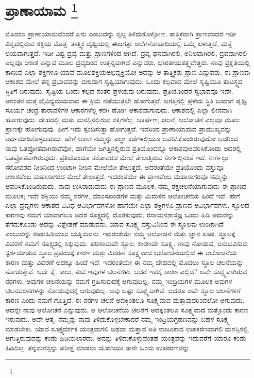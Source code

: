 
\vspace{-0.8cm}

\chapter[ಪ್ರಾಣಾಯಾಮ ]{ಪ್ರಾಣಾಯಾಮ \protect\footnote{}}

ಮೊದಲು ಪ್ರಾಣಾಯಾಮವೆಂದರೆ ಏನು ಎಂಬುದನ್ನು ಸ್ವಲ್ಪ ತಿಳಿದುಕೊಳ್ಳೋಣ. ತಾತ್ತ್ವಿಕವಾಗಿ ಪ್ರಾಣವೆಂದರೆ ಇಡೀ ವಿಶ್ವದಲ್ಲಿರುವ ಶಕ್ತಿಯ ಮೊತ್ತ. ತಾತ್ತ್ವಿಕ ದೃಷ್ಟಿಯಲ್ಲಿ ಈ\break ಜಗತ್ತು ಅಲೆಗಳೋಪಾದಿಯಲ್ಲಿ ಒಮ್ಮೆ ಏಳುತ್ತದೆ, ಮತ್ತೆ ಲಯವಾಗುತ್ತದೆ. ಇಡೀ ವಿಶ್ವ ದ್ರವ್ಯ ಮತ್ತು ಪ್ರಾಣಗಳಿಂದ ಆಗಿದೆ. ದ್ರವ್ಯ ಘನವಾಗಿರಲಿ, ಅನಿಲವಾಗಿರಲಿ, ದ್ರವವಾಗಿರಲಿ ಎಲ್ಲವೂ ಆಕಾಶ ಎನ್ನುವ ಮೂಲ ದ್ರವ್ಯದಿಂದ ಉತ್ಪನ್ನವಾಗಿದೆ ಎನ್ನುವರು, ಭಾರತೀಯ\break ತತ್ತ್ವವೇತ್ತರು. ನಾವು ಪ್ರಕೃತಿಯಲ್ಲಿ ಕಾಣುವ ಎಲ್ಲಾ ಶಕ್ತಿಗಳೂ ಯಾವ ಮೂಲಶಕ್ತಿಯ\break ಅಭಿವ್ಯಕ್ತಿಯೋ ಅದನ್ನು ಆ ತಾತ್ತ್ವಿಕರು ಪ್ರಾಣ ಎನ್ನುವರು. ಈ ಪ್ರಾಣವು ಆಕಾಶದ ಮೇಲೆ ತನ್ನ ಪ್ರಭಾವವನ್ನು ಬೀರಿದಾಗ ಸೃಷ್ಟಿಯಾಗುವುದು. ಒಂದು ಕಲ್ಪವಾದ ಮೇಲೆ ಸೃಷ್ಟಿಯೂ ತಾಟಸ್ಥ್ಯದ ಸ್ಥಿತಿಗೆ ಬರುವುದು. ಸೃಷ್ಟಿಯ ಒಂದು ಕಲ್ಪದ ನಂತರ ಪ್ರಳಯವು ಬರುವುದು. ಪ್ರತಿಯೊಂದರ ಸ್ವಭಾವವೂ ಇದೇ. ಅನಂತರ ಮತ್ತೆ ವೈವಿಧ್ಯಮಯವಾದ ಈ ಕ್ರಿಯೆ ನಡೆಯುತ್ತಲೇ ಹೋಗುತ್ತದೆ. ಜಗತ್ತಿನಲ್ಲಿ ಪ್ರಳಯ ಸ್ಥಿತಿ ಬಂದಾಗ ಪೃಥ್ವಿ ಸೂರ್ಯ ಚಂದ್ರ ತಾರಾವಳಿಗಳ ಆಕಾರಗಳೆಲ್ಲ ಕರಗಿ ಹೋಗಿ ಆಕಾಶವಾಗುವುದು. ಆಕಾಶದಲ್ಲಿ ಎಲ್ಲಾ ಲೀನವಾಗಿ ಹೋಗುವುದು. ದೇಹದಲ್ಲಿ ಮತ್ತು ಮನಸ್ಸಿನಲ್ಲಿರುವ ಶಕ್ತಿಗಳೆಲ್ಲ, ಆಕರ್ಷಣ, ಚಲನೆ, ಆಲೋಚನೆ ಎಲ್ಲವೂ ಮೂಲ ಪ್ರಾಣಕ್ಕೇ ಹೋಗುವುವು. ಹೀಗೆ ಇದು ಸ್ಪಂದಿಸುತ್ತಾ ಹೋಗುತ್ತದೆ. ಇದರಿಂದ ಪ್ರಾಣಾಯಾಮದ ಪ್ರಾಮುಖ್ಯವನ್ನು ಅರ್ಥಮಾಡಿಕೊಳ್ಳಬಹುದು. ಹೇಗೆ ಆಕಾಶ ನಮ್ಮನ್ನು ಎಲ್ಲಾ ಕಡೆಗಳಲ್ಲಿಯೂ ಆವರಿಸಿಕೊಂಡಿರುವುದೋ ಅದರಿಂದ ನಾವು ಓತಪ್ರೋತವಾಗಿರುವೆವೋ, ಹಾಗೆಯೇ ಜಗತ್ತಿನಲ್ಲಿರುವ ಪ್ರತಿಯೊಂದನ್ನೂ ಆಕಾಶವು\break ಆವರಿಸಿಕೊಂಡು ಅದರಲ್ಲಿ ಓತಪ್ರೋತವಾಗಿರುವುದು. ಪ್ರತಿಯೊಂದೂ ಸರೋವರದ ಮೇಲೆ ತೇಲುತ್ತಿರುವ ನೀರ್ಗಲ್ಲಿನಂತೆ ಇದೆ. ನೀರ್ಗಲ್ಲು ಸರೋವರದ ನೀರಿನಿಂದ ಉಂಟಾಗಿ ನೀರಿನ ಮೇಲೆಯೇ ತೇಲುತ್ತದೆ. ಅದರಂತೆಯೇ ಪ್ರತಿಯೊಂದು ವಸ್ತುವೂ ಆಕಾಶವೆಂಬ ಮಹಾಸಾಗರದ ಮೇಲೆ ತೇಲುತ್ತದೆ. ಇದರಂತೆಯೇ ಈ ಪ್ರಾಣವೆಂಬ ಮಹಾಸಾಗರವೂ ನಮ್ಮನ್ನು ಆವರಿಸಿಕೊಂಡಿರುವುದು. ನಾವು ಉಸಿರಾಡುವುದು ಈ ಪ್ರಾಣದ ಮೂಲಕ, ನಮ್ಮ ರಕ್ತಚಲನೆಯಾಗುವುದು ಈ ಪ್ರಾಣದ ಮೂಲಕ; ಇದೇ ಶಕ್ತಿಯು ನಮ್ಮ ನರಗಳ, ಮಾಂಸಖಂಡಗಳ ಮತ್ತು ಮಿದುಳಿನ ಆಲೋಚನೆಯ ಹಿಂದೆ ಇದೆ. ಹೇಗೆ ಎಲ್ಲಾ ದ್ರವ್ಯಗಳು ಆಕಾಶದ ವಿವಿಧ ಆವಿರ್ಭಾವಗಳೋ ಹಾಗೆಯೇ ಎಲ್ಲಾ ಶಕ್ತಿಗಳೂ ಪ್ರಾಣದ ಆವಿರ್ಭಾವಗಳು. ಸ್ಥೂಲದ ಕಾರಣವು ನಮಗೆ ಯಾವಾಗಲೂ ಅದರ ಸೂಕ್ಷ್ಮದಲ್ಲಿ ದೊರಕುವುದು. ರಸಾಯನಶಾಸ್ತ್ರಜ್ಞ ಒಂದು ಹಿಡಿ ಅದುರನ್ನು ತೆಗೆದುಕೊಂಡು ಅದನ್ನು ವಿಶ್ಲೇಷಣೆ ಮಾಡುವನು. ಯಾವ ಸೂಕ್ಷ್ಮ ವಸ್ತುವಿನಿಂದ ಈ ಸ್ಥೂಲವು ಉಂಟಾಗಿದೆ ಎಂಬುದನ್ನು ಕಂಡುಹಿಡಿಯಲು ಯತ್ನಿಸುವನು. ಇದರಂತೆಯೇ ನಮ್ಮ ಆಲೋಚನೆ ಮತ್ತು ಜ್ಞಾನ ಕೂಡ. ಸ್ಥೂಲಕ್ಕೆ ವಿವರಣೆ ನಮಗೆ ಸೂಕ್ಷ್ಮದಲ್ಲಿ ಸಿಕ್ಕುವುದು. ಪರಿಣಾಮವೇ ಸ್ಥೂಲ, ಕಾರಣವೇ ಸೂಕ್ಷ್ಮ. ನಾವು ನೋಡುವ, ಅನುಭವಿಸುವ, ಸ್ಪರ್ಶಮಾಡುವ ಸ್ಥೂಲ ಪ್ರಪಂಚಕ್ಕೆ ಕಾರಣ ಮತ್ತು ವಿವರಣೆ ಸೂಕ್ಷ್ಮವಾದ ಆಲೋಚನೆಯಲ್ಲಿದೆ ಈ ಆಲೋಚನೆಯ ಕಾರಣ ಮತ್ತು ವಿವರಣೆ ಅದಕ್ಕೂ ಹಿಂದೆ ಇದೆ. ಇದರಂತೆಯೇ ಈ ನಮ್ಮ ದೇಹದಲ್ಲಿ ಮೊದಲು ಸ್ಥೂಲ ಚಲನೆಯನ್ನು ನೋಡುತ್ತೇವೆ. ಅದೇ ಕೈ, ಕಾಲು, ತುಟಿ ಇವುಗಳ ಚಲನೆಗಳು. ಆದರೆ ಇವಕ್ಕೆ ಕಾರಣ ಎಲ್ಲಿದೆ? ಅವೇ ಸೂಕ್ಷ್ಮವಾಗಿರುವ ನರಗಳು. ಅವುಗಳ ಚಲನೆಯನ್ನು ನಮಗೆ ಗ್ರಹಿಸುವುದಕ್ಕೆ ಆಗುವುದಿಲ್ಲ. ನಮ್ಮ ಇಂದ್ರಿಯಗಳ ಮೂಲಕ ಅವುಗಳ ಚಲನವಲನಗಳನ್ನು ನೋಡುವುದಕ್ಕೆ ಆಗುವುದಿಲ್ಲ. ಅವು ಅಷ್ಟು ಸೂಕ್ಷ್ಮವಾಗಿವೆ. ಆದರೂ ಅವೇ ಸ್ಥೂಲ ಚಲನೆಗಳಿಗೆ ಕಾರಣ ಎಂದು ನಮಗೆ ಗೊತ್ತಿದೆ. ಈ ನರಗಳ ಚಲನೆ ಅದಕ್ಕಿಂತಲೂ ಸೂಕ್ಷ್ಮವಾದ ಮತ್ತಾವುದರಿಂದಲೋ ಆಗುವುದು. ಅದನ್ನೇ ನಾವು ಆಲೋಚನೆ ಎನ್ನುವುದು. ಆ ಆಲೋಚನೆಯ ಚಲನೆಗೆ ಅದಕ್ಕಿಂತಲೂ ಸೂಕ್ಷ್ಮವಾದ ಮತ್ತೊಂದು ಕಾರಣ ಇರುವುದು. ಅದೇ ಆತ್ಮ. ನಮ್ಮನ್ನು ನಾವು ತಿಳಿದುಕೊಳ್ಳಬೇಕಾದರೆ ನಮ್ಮ ಇಂದ್ರಿಯಗ್ರಹಣವನ್ನು ಬಹಳ ಸೂಕ್ಷ್ಮ ಮಾಡಬೇಕು. ಯಾವ ಸೂಕ್ಷ್ಮದರ್ಶಕ ಯಂತ್ರವಾಗಲಿ ಅಥವಾ ಮತ್ತಾವ ಅತಿ ನಾಜೂಕಾದ ಉಪಕರಣವಾಗಲಿ ಮನಸ್ಸಿನಲ್ಲಿ ಆಗುತ್ತಿರುವುದನ್ನು ಕಂಡು ಹಿಡಿಯಲಾರದು. ಅದನ್ನು ತಿಳಿದುಕೊಳ್ಳುವಂತಹ ಯಂತ್ರವನ್ನು ಇದುವರೆಗೆ ಯಾರೂ ಕಂಡು ಹಿಡಿದಿಲ್ಲ. ತನ್ನ\break ಮನಸ್ಸನ್ನು ಪರೀಕ್ಷೆ ಮಾಡಲು ಯೋಗಿಯು ತಾನೇ ಒಂದು ಉಪಕರಣವನ್ನು 